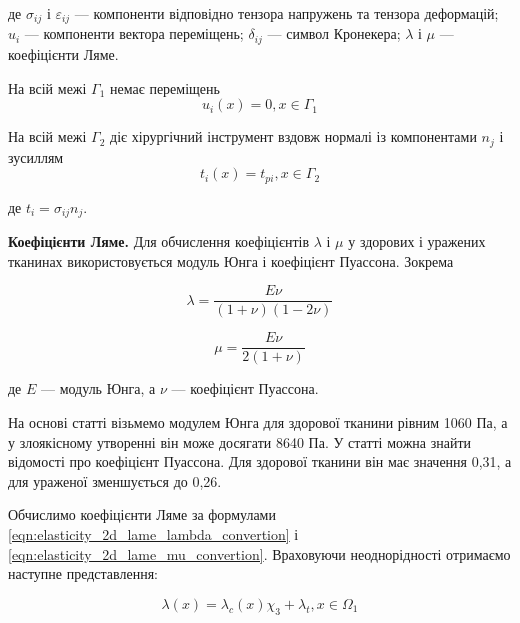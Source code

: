 \noindent де $\sigma_{ij}$ і $\varepsilon_{ij}$ --- компоненти відповідно тензора напружень та тензора деформацій; $u_i$
--- компоненти вектора переміщень; $\delta_{ij}$ --- символ Кронекера; $\lambda$ і $\mu$ --- коефіцієнти Ляме.

\noindent На всій межі $\Gamma_1$ немає переміщень
\begin{equation}
    \label{eqn:elasticity_2d_cond_1}
    u_i(x) = 0, x \in \Gamma_1
\end{equation}

\noindent На всій межі $\Gamma_2$ діє хірургічний інструмент вздовж нормалі із компонентами $n_j$ і зусиллям
\begin{equation}
    \label{eqn:elasticity_2d_cond_2}
    t_i(x) = t_{pi}, x \in \Gamma_2
\end{equation}

\noindent де $t_i = \sigma_{ij}n_j$.

\textbf{Коефіцієнти Ляме.} Для обчислення коефіцієнтів $\lambda$ і $\mu$ у здорових і уражених тканинах використовується
модуль Юнга і коефіцієнт Пуассона. Зокрема

\begin{equation}
    \label{eqn:elasticity_2d_lame_lambda_convertion}
    \lambda = \frac{E\nu}{(1+\nu)(1-2\nu)}
\end{equation}

\begin{equation}
    \label{eqn:elasticity_2d_lame_mu_convertion}
    \mu = \frac{E\nu}{2(1+\nu)}
\end{equation}

\noindent де $E$ --- модуль Юнга, а $\nu$ --- коефіцієнт Пуассона.  

На основі статті \cite{elast-young-modulus-cancer} візьмемо модулем Юнга для здорової тканини рівним 1060 Па, а у 
злоякісному утворенні він може досягати 8640 Па. У статті \cite{elast-poisson-rato-cancer} можна знайти відомості про 
коефіцієнт Пуассона. Для здорової тканини він має значення 0,31, а для ураженої зменшується до 0,26. 

Обчислимо коефіцієнти Ляме за формулами \ref{eqn:elasticity_2d_lame_lambda_convertion} і 
\ref{eqn:elasticity_2d_lame_mu_convertion}. Враховуючи неоднорідності отримаємо наступне представлення:

\begin{equation}
    \label{eqn:elasticity_2d_lyame_lambda}
    \lambda(x) = \lambda_c(x)\chi_3 + \lambda_t, x \in \Omega_1
\end{equation}

